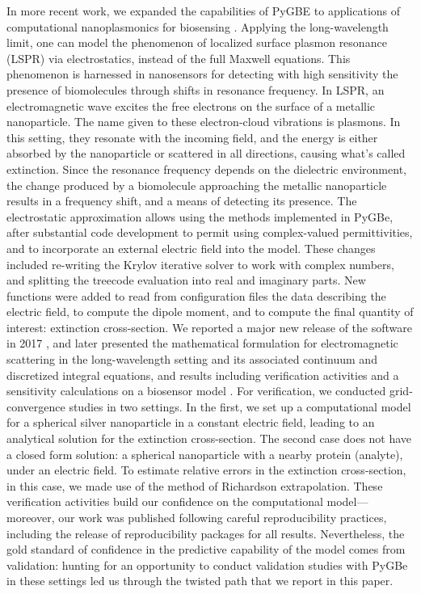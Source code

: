In more recent work, we expanded the capabilities of PyGBE to applications of computational nanoplasmonics for biosensing \cite{ClementiETal2019}. 
Applying the long-wavelength limit, one can model the phenomenon of localized surface plasmon resonance (LSPR) via electrostatics, instead of the full Maxwell equations. 
This phenomenon is harnessed in nanosensors for detecting with high sensitivity the presence of biomolecules through shifts in resonance frequency. 
In LSPR, an electromagnetic wave excites the free electrons on the surface of a metallic nanoparticle. 
The name given to these electron-cloud vibrations is plasmons. 
In this setting, they resonate with the incoming field, and the energy is either absorbed by the nanoparticle or scattered in all directions, causing what's called extinction.
Since the resonance frequency depends on the dielectric environment, the change produced by a biomolecule approaching the metallic nanoparticle results in a frequency shift, and a means of detecting its presence.
The electrostatic approximation allows using the methods implemented in PyGBe, after substantial code development to permit using complex-valued permittivities, and to incorporate an external electric field into the model. 
These changes included re-writing the Krylov iterative solver to work with complex numbers, and splitting the treecode evaluation into real and imaginary parts. 
New functions were added to read from configuration files the data describing the electric field, to compute the dipole moment, and to compute the final quantity of interest: extinction cross-section. 
We reported a major new release of the software in 2017 \cite{ClementiETal2017}, and later  presented the mathematical formulation for electromagnetic scattering in the long-wavelength setting and its associated continuum and discretized integral equations, and results including verification activities and a sensitivity calculations on a biosensor model \cite{ClementiETal2019}. 
For verification, we conducted grid-convergence studies in two settings.
In the first, we set up a computational model for a spherical silver nanoparticle in a constant electric field, leading to an analytical solution for the extinction cross-section. 
The second case does not have a closed form solution: a spherical nanoparticle with a nearby protein (analyte), under an electric field. 
To estimate relative errors in the extinction cross-section, in this case, we made use of the method of Richardson extrapolation.
These verification activities build our confidence on the computational model---moreover, our work was published following careful reproducibility practices, including the release of reproducibility packages for all results. 
Nevertheless, the gold standard of confidence in the predictive capability of the model comes from validation: hunting for an opportunity to conduct validation studies with PyGBe in these settings led us through the twisted path that we report in this paper.


